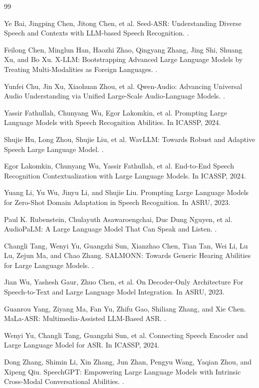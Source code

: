 \documentclass[UTF8,fontset=fandol]{ctexart}
\begin{document}
\begin{thebibliography}{99}

Ye Bai, Jingping Chen, Jitong Chen, et al.
\newblock Seed-ASR: Understanding Diverse Speech and Contexts with LLM-based Speech Recognition.
.

Feilong Chen, Minglun Han, Haozhi Zhao, Qingyang Zhang, Jing Shi, Shuang Xu, and Bo Xu.
\newblock X-LLM: Bootstrapping Advanced Large Language Models by Treating Multi-Modalities as Foreign Languages.
.

Yunfei Chu, Jin Xu, Xiaohuan Zhou, et al.
\newblock Qwen-Audio: Advancing Universal Audio Understanding via Unified Large-Scale Audio-Language Models.
.

Yassir Fathullah, Chunyang Wu, Egor Lakomkin, et al.
\newblock Prompting Large Language Models with Speech Recognition Abilities.
\newblock In ICASSP, 2024.

Shujie Hu, Long Zhou, Shujie Liu, et al.
\newblock WavLLM: Towards Robust and Adaptive Speech Large Language Model.
.

Egor Lakomkin, Chunyang Wu, Yassir Fathullah, et al.
\newblock End-to-End Speech Recognition Contextualization with Large Language Models.
\newblock In ICASSP, 2024.

Yuang Li, Yu Wu, Jinyu Li, and Shujie Liu.
\newblock Prompting Large Language Models for Zero-Shot Domain Adaptation in Speech Recognition.
\newblock In ASRU, 2023.

Paul K. Rubenstein, Chulayuth Asawaroengchai, Duc Dung Nguyen, et al.
\newblock AudioPaLM: A Large Language Model That Can Speak and Listen.
.

Changli Tang, Wenyi Yu, Guangzhi Sun, Xianzhao Chen, Tian Tan, Wei Li, Lu Lu, Zejun Ma, and Chao Zhang.
\newblock SALMONN: Towards Generic Hearing Abilities for Large Language Models.
.

Jian Wu, Yashesh Gaur, Zhuo Chen, et al.
\newblock On Decoder-Only Architecture For Speech-to-Text and Large Language Model Integration.
\newblock In ASRU, 2023.

Guanrou Yang, Ziyang Ma, Fan Yu, Zhifu Gao, Shiliang Zhang, and Xie Chen.
\newblock MaLa-ASR: Multimedia-Assisted LLM-Based ASR.
.

Wenyi Yu, Changli Tang, Guangzhi Sun, et al.
\newblock Connecting Speech Encoder and Large Language Model for ASR.
\newblock In ICASSP, 2024.

Dong Zhang, Shimin Li, Xin Zhang, Jun Zhan, Pengyu Wang, Yaqian Zhou, and Xipeng Qiu.
\newblock SpeechGPT: Empowering Large Language Models with Intrinsic Cross-Modal Conversational Abilities.
.

\end{thebibliography}
\end{document}

